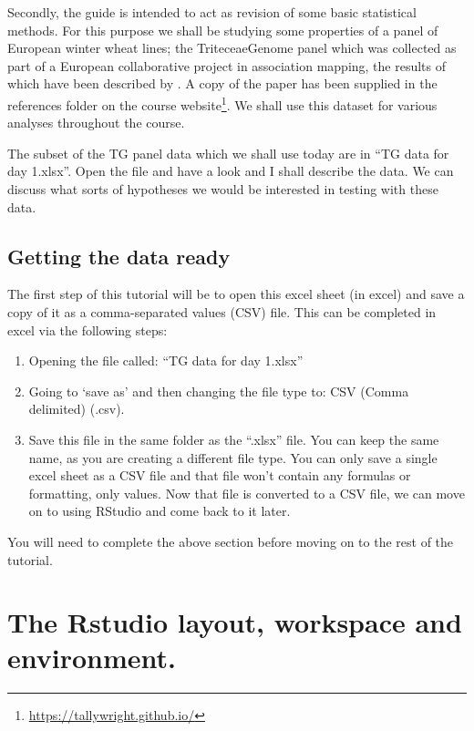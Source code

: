 \documentclass[
]{book}
\makeatletter
\renewcommand{\href}[2]{#2\footnote{\url{#1}}}
\newenvironment{kframe}{%
\medskip{}
\setlength{\fboxsep}{.8em}
 \def\at@end@of@kframe{}%
 \ifinner\ifhmode%
  \def\at@end@of@kframe{\end{minipage}}%
  \begin{minipage}{\columnwidth}%
 \fi\fi%
 \def\FrameCommand##1{\hskip\@totalleftmargin \hskip-\fboxsep
 \colorbox{shadecolor}{##1}\hskip-\fboxsep
     \hskip-\linewidth \hskip-\@totalleftmargin \hskip\columnwidth}%
 \MakeFramed {\advance\hsize-\width
   \@totalleftmargin\z@ \linewidth\hsize
   \@setminipage}}%
 {\par\unskip\endMakeFramed%
 \at@end@of@kframe}
\newenvironment{rmdblock}[1]
  {
  \begin{itemize}
  \renewcommand{\labelitemi}{
    \raisebox{-.7\height}[0pt][0pt]{
      {\setkeys{Gin}{width=3em,keepaspectratio}\texttt{[image: images/\#1]}}
    }
  }
  \setlength{\fboxsep}{1em}
  \begin{kframe}
  \item
  }
  {
  \end{kframe}
  \end{itemize}
  }
\newenvironment{rmdcaution}
  {\begin{rmdblock}{caution}}
  {\end{rmdblock}}
\makeatother
\begin{document}
Secondly, the guide is intended to act as revision of some basic statistical methods. For this purpose we shall be studying some properties of a panel of European winter wheat lines; the TriteceaeGenome panel which was collected as part of a European collaborative project in association mapping, the results of which have been described by \citep{Bentley2014}. A copy of the paper has been supplied in the references folder on the course \href{https://tallywright.github.io/}{website}. We shall use this dataset for various analyses throughout the course.

The subset of the TG panel data which we shall use today are in ``TG data for day 1.xlsx''. Open the file and have a look and I shall describe the data. We can discuss what sorts of hypotheses we would be interested in testing with these data.

\hypertarget{getting-the-data-ready}{%
\subsection{Getting the data ready}\label{getting-the-data-ready}}

The first step of this tutorial will be to open this excel sheet (in excel) and save a copy of it as a comma-separated values (CSV) file. This can be completed in excel via the following steps:

\begin{enumerate}
\def\labelenumi{\arabic{enumi}.}
\item
  Opening the file called: ``TG data for day 1.xlsx''
\item
  Going to `save as' and then changing the file type to: CSV (Comma delimited) (.csv).
\item
  Save this file in the same folder as the ``.xlsx'' file. You can keep the same name, as you are creating a different file type. You can only save a single excel sheet as a CSV file and that file won't contain any formulas or formatting, only values. Now that file is converted to a CSV file, we can move on to using RStudio and come back to it later.
\end{enumerate}

\begin{rmdcaution}
You will need to complete the above section before moving on to the rest of the tutorial.
\end{rmdcaution}

\hypertarget{the-rstudio-layout-workspace-and-environment.}{%
\section{The Rstudio layout, workspace and environment.}\label{the-rstudio-layout-workspace-and-environment.}}
\end{document}
